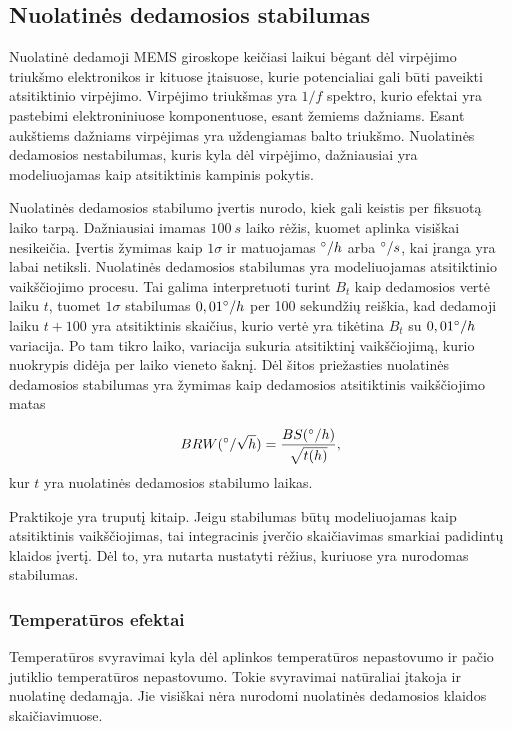 \subsection{Nuolatinės dedamosios stabilumas}

Nuolatinė dedamoji MEMS giroskope keičiasi laikui bėgant dėl virpėjimo triukšmo elektronikos ir kituose įtaisuose, kurie potencialiai gali būti paveikti atsitiktinio virpėjimo. 
Virpėjimo triukšmas yra $1/f$ spektro, kurio efektai yra pastebimi elektroniniuose komponentuose, esant žemiems dažniams. 
Esant aukštiems dažniams virpėjimas yra uždengiamas balto triukšmo. 
Nuolatinės dedamosios nestabilumas, kuris kyla dėl virpėjimo, dažniausiai yra modeliuojamas kaip atsitiktinis kampinis pokytis.

Nuolatinės dedamosios stabilumo įvertis nurodo, kiek gali keistis per fiksuotą laiko tarpą. 
Dažniausiai imamas $100~s$ laiko rėžis, kuomet aplinka visiškai nesikeičia. 
Įvertis žymimas kaip $1\sigma$ ir matuojamas $\degree/h$ arba $\degree/s$, kai įranga yra labai netiksli. 
Nuolatinės dedamosios stabilumas yra modeliuojamas atsitiktinio vaikščiojimo procesu. 
Tai galima interpretuoti turint $B_t$ kaip dedamosios vertė laiku $t$, tuomet $1\sigma$ stabilumas $0,01\degree/h$ per 100 sekundžių reiškia, kad dedamoji laiku $t+100$ yra atsitiktinis skaičius, kurio vertė yra tikėtina $B_t$ su $0,01\degree/h$ variacija. 
Po tam tikro laiko, variacija sukuria atsitiktinį vaikščiojimą, kurio nuokrypis didėja per laiko vieneto šaknį. 
Dėl šitos priežasties nuolatinės dedamosios stabilumas yra žymimas kaip dedamosios atsitiktinis vaikščiojimo matas

\begin{equation}
    BRW (\degree / \sqrt{h}) = \frac{BS(\degree/h)}{\sqrt{t(h)}},
\end{equation}
kur $t$ yra nuolatinės dedamosios stabilumo laikas.

Praktikoje yra truputį kitaip. 
Jeigu stabilumas būtų modeliuojamas kaip atsitiktinis vaikščiojimas, tai integracinis įverčio skaičiavimas smarkiai padidintų klaidos įvertį. 
Dėl to, yra nutarta nustatyti rėžius, kuriuose yra nurodomas stabilumas.

\subsubsection{Temperatūros efektai}

Temperatūros svyravimai kyla dėl aplinkos temperatūros nepastovumo ir pačio jutiklio temperatūros nepastovumo. 
Tokie svyravimai natūraliai įtakoja ir nuolatinę dedamąja. 
Jie visiškai nėra nurodomi nuolatinės dedamosios klaidos skaičiavimuose.

